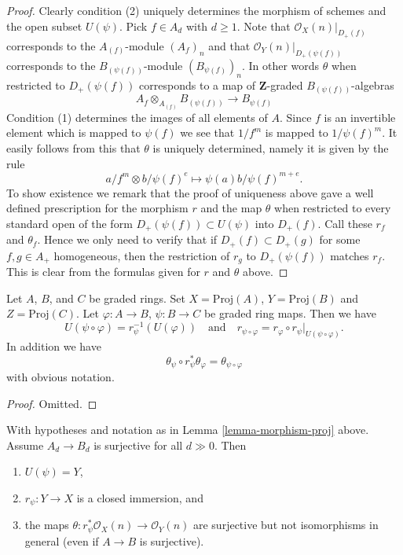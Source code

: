 \begin{proof}
Clearly condition (2) uniquely determines the morphism of schemes
and the open subset $U(\psi)$. Pick $f \in A_d$ with $d \geq 1$.
Note that
$\mathcal{O}_X(n)|_{D_{+}(f)}$ corresponds to the
$A_{(f)}$-module $(A_f)_n$ and that
$\mathcal{O}_Y(n)|_{D_{+}(\psi(f))}$ corresponds to the
$B_{(\psi(f))}$-module $(B_{\psi(f)})_n$. In other words $\theta$
when restricted to $D_{+}(\psi(f))$ corresponds to a map of
$\mathbf{Z}$-graded $B_{(\psi(f))}$-algebras
$$
A_f \otimes_{A_{(f)}} B_{(\psi(f))}
\longrightarrow
B_{\psi(f)}
$$
Condition (1) determines the images of all elements of $A$.
Since $f$ is an invertible element which is mapped to $\psi(f)$
we see that $1/f^m$ is mapped to $1/\psi(f)^m$. It easily follows
from this that $\theta$ is uniquely determined, namely it is
given by the rule
$$
a/f^m \otimes b/\psi(f)^e \longmapsto \psi(a)b/\psi(f)^{m + e}.
$$
To show existence we remark that the proof of uniqueness above gave
a well defined prescription for the morphism $r$ and the map $\theta$
when restricted to every standard open of the form
$D_{+}(\psi(f)) \subset U(\psi)$ into $D_{+}(f)$.
Call these $r_f$ and $\theta_f$.
Hence we only need to verify that if $D_{+}(f) \subset D_{+}(g)$
for some $f, g \in A_{+}$ homogeneous, then the restriction of
$r_g$ to $D_{+}(\psi(f))$ matches $r_f$. This is clear from the
formulas given for $r$ and $\theta$ above.
\end{proof}

\begin{lemma}
\label{lemma-morphism-proj-transitive}
Let $A$, $B$, and $C$ be graded rings.
Set $X = \text{Proj}(A)$, $Y = \text{Proj}(B)$ and $Z = \text{Proj}(C)$.
Let $\varphi : A \to B$, $\psi : B \to C$ be graded ring maps.
Then we have
$$
U(\psi \circ \varphi) = r_\psi^{-1}(U(\varphi))
\quad
\text{and}
\quad
r_{\psi \circ \varphi}
=
r_\varphi \circ r_\psi|_{U(\psi \circ \varphi)}.
$$
In addition we have
$$
\theta_\psi \circ r_\psi^*\theta_\varphi
=
\theta_{\psi \circ \varphi}
$$
with obvious notation.
\end{lemma}

\begin{proof}
Omitted.
\end{proof}

\begin{lemma}
\label{lemma-surjective-graded-rings-map-proj}
With hypotheses and notation as in Lemma \ref{lemma-morphism-proj} above.
Assume $A_d \to B_d$ is surjective for all $d \gg 0$. Then
\begin{enumerate}
\item $U(\psi) = Y$,
\item $r_\psi : Y \to X$ is a closed immersion, and
\item the maps $\theta : r_\psi^*\mathcal{O}_X(n) \to \mathcal{O}_Y(n)$
are surjective but not isomorphisms in general (even if $A \to B$ is
surjective).
\end{enumerate}
\end{lemma}

